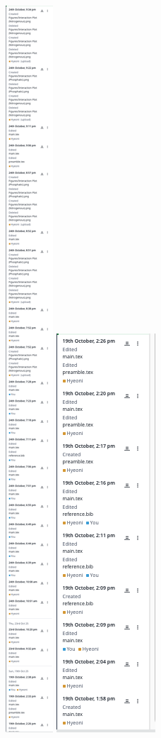 \documentclass[12pt]{article}
\begin{document}
\begin{figure}[ht]
    \includegraphics[width=0.08\linewidth]{History/History 3.png}
    \includegraphics[width=0.08\linewidth]{History/History 4.png}
\end{figure}
\end{document}
